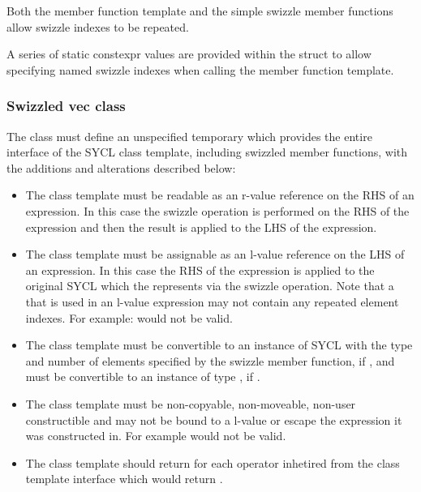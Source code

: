 Both the  member function template and the simple swizzle member functions allow swizzle indexes to be repeated.

A series of static constexpr values are provided within the  struct to allow specifying named swizzle indexes when calling the  member function template.

\subsubsection{Swizzled vec class}
\label{swizzled-vec-class}

The  class must define an unspecified temporary which provides the entire interface of the SYCL  class template, including swizzled member functions, with the additions and alterations described below:

\begin{itemize}

\item The  class template must be readable as an r-value reference on the RHS of an expression. In this case the swizzle operation is performed on the RHS of the expression and then the result is applied to the LHS of the expression.

\item The  class template must be assignable as an l-value reference on the LHS of an expression. In this case the RHS of the expression is applied to the original SYCL  which the  represents via the swizzle operation. Note that a  that is used in an l-value expression may not contain any repeated element indexes. \newline For example:  would not be valid.

\item The  class template must be convertible to an instance of SYCL  with the type  and number of elements specified by the swizzle member function, if , and must be convertible to an instance of type , if .

\item The  class template must be non-copyable, non-moveable, non-user constructible and may not be bound to a l-value or escape the expression it was constructed in. For example  would not be valid.

\item The  class template should return  for each operator inhetired from the  class template interface which would return  .

\end{itemize}

